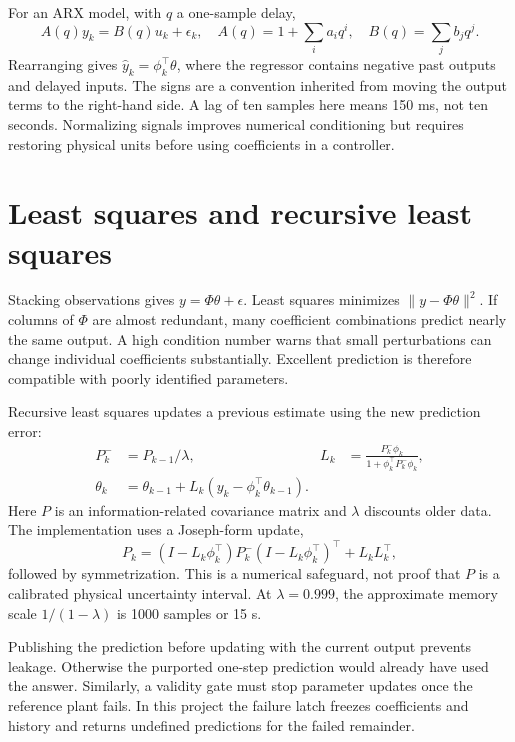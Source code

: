 For an ARX model, with $q$ a one-sample delay,
\begin{equation}A(q)y_k=B(q)u_k+\epsilon_k,\quad
A(q)=1+\sum_i a_iq^i,\quad B(q)=\sum_jb_jq^j.
\end{equation}
Rearranging gives $\hat y_k=\phi_k^\top\theta$, where the regressor contains negative past outputs and delayed inputs. The signs are a convention inherited from moving the output terms to the right-hand side. A lag of ten samples here means 150 ms, not ten seconds. Normalizing signals improves numerical conditioning but requires restoring physical units before using coefficients in a controller.

\section{Least squares and recursive least squares}
Stacking observations gives $y=\Phi\theta+\epsilon$. Least squares minimizes $\|y-\Phi\theta\|^2$. If columns of $\Phi$ are almost redundant, many coefficient combinations predict nearly the same output. A high condition number warns that small perturbations can change individual coefficients substantially. Excellent prediction is therefore compatible with poorly identified parameters.

Recursive least squares updates a previous estimate using the new prediction error:
\begin{align}
P_k^-&=P_{k-1}/\lambda,&
L_k&=\frac{P_k^-\phi_k}{1+\phi_k^\top P_k^-\phi_k},\\
\theta_k&=\theta_{k-1}+L_k(y_k-\phi_k^\top\theta_{k-1}).
\end{align}
Here $P$ is an information-related covariance matrix and $\lambda$ discounts older data. The implementation uses a Joseph-form update,
\begin{equation}P_k=(I-L_k\phi_k^\top)P_k^-(I-L_k\phi_k^\top)^\top+L_kL_k^\top,
\end{equation}
followed by symmetrization. This is a numerical safeguard, not proof that $P$ is a calibrated physical uncertainty interval. At $\lambda=0.999$, the approximate memory scale $1/(1-\lambda)$ is 1000 samples or 15 s.

Publishing the prediction before updating with the current output prevents leakage. Otherwise the purported one-step prediction would already have used the answer. Similarly, a validity gate must stop parameter updates once the reference plant fails. In this project the failure latch freezes coefficients and history and returns undefined predictions for the failed remainder.

